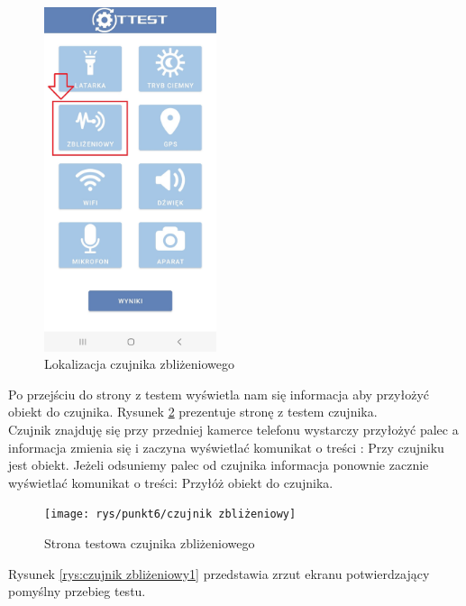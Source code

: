 \begin{figure}[!hbt]
	\begin{center}
		\includegraphics[angle=360, width=0.45\textwidth]{rys/punkt6/menu3.jpg}
		\caption{Lokalizacja czujnika zbliżeniowego}
		\label{rys:menu3}
	\end{center}
\end{figure}

Po przejściu do strony z testem wyświetla nam się informacja aby przyłożyć obiekt do czujnika. Rysunek \ref{rys:czujnik zbliżeniowy} prezentuje stronę z testem czujnika. \\

Czujnik znajduję się przy przedniej kamerce telefonu wystarczy przyłożyć palec a informacja zmienia się i zaczyna wyświetlać komunikat o treści : Przy czujniku jest obiekt. Jeżeli odsuniemy palec od czujnika informacja ponownie zacznie wyświetlać komunikat o treści: Przyłóż obiekt do czujnika.

\newpage


\begin{figure}[!hbt]
	\begin{center}
		\texttt{[image: rys/punkt6/czujnik zbliżeniowy]}
		\caption{Strona testowa czujnika zbliżeniowego}
		\label{rys:czujnik zbliżeniowy}
	\end{center}
\end{figure}

Rysunek \ref{rys:czujnik zbliżeniowy1} przedstawia zrzut ekranu potwierdzający pomyślny przebieg testu.


